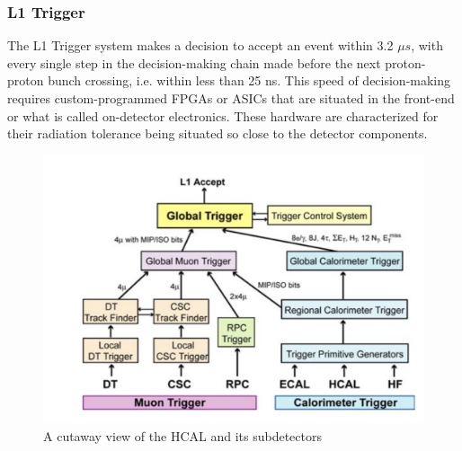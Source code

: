 \subsubsection{L1 Trigger}
The L1 Trigger system makes a decision to accept an event within 3.2 $\mu s$, with every single step in the decision-making chain made before the next proton-proton bunch crossing, i.e. within less than 25 ns. This speed of decision-making requires custom-programmed FPGAs or ASICs that are situated in the front-end or what is called on-detector electronics. These hardware are characterized for their radiation tolerance being situated so close to the detector components. 

\begin{figure}[htbp!]
    \caption{A cutaway view of the HCAL and its subdetectors \cite{CMS:2008xjf}}
    \begin{center}
        \includegraphics[scale=0.6]{fig/L1Trigger.png}
    \end{center}
    \label{fig:L1Trigger}
\end{figure}


